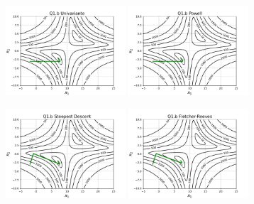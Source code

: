\documentclass[10pt, a4paper]{article}
\begin{document}
\begin{figure}[H]
  \centering
  \begin{subfigure}[b]{\textwidth}
    \includegraphics[width=0.49\textwidth]{figuras/Q1.b_Univariante_P0=[-2e-3].pdf}
    \includegraphics[width=0.49\textwidth]{figuras/Q1.b_Powell_P0=[-2e-3].pdf}
  \end{subfigure}
  \begin{subfigure}[b]{\textwidth}
    \includegraphics[width=0.49\textwidth]{figuras/Q1.b_Steepest Descent_P0=[-2e-3].pdf}
    \includegraphics[width=0.49\textwidth]{figuras/Q1.b_Fletcher-Reeves_P0=[-2e-3].pdf}

\end{subfigure}
\end{figure}
\end{document}
